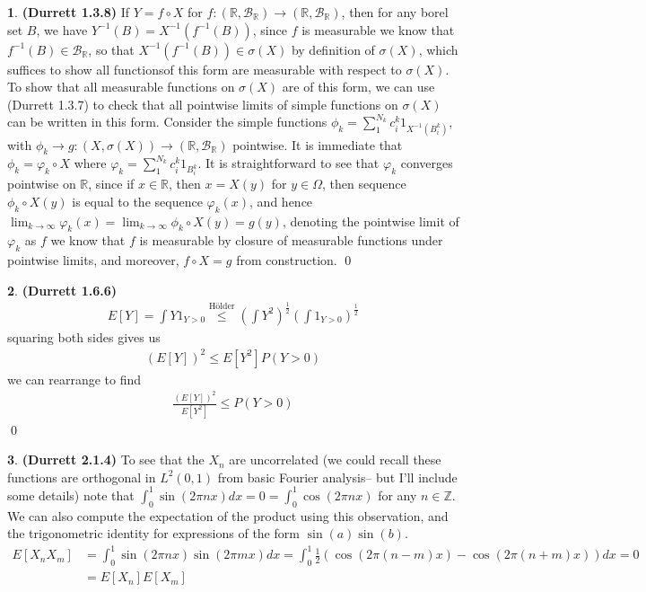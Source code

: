\documentclass[10.5pt]{article}
\theoremstyle{definition}
\newtheorem{pb}{}
\begin{document}
    \begin{pb} \textbf{(Durrett 1.3.8)}
        If \(Y = f\circ X\) for \(f: (\mathbb{R},\mathcal{B}_\mathbb{R}) \to (\mathbb{R},\mathcal{B}_\mathbb{R})\), then for any borel set \(B\), we have \(Y^{-1}(B) = X^{-1}(f^{-1}(B))\), since \(f\) is measurable we know that \(f^{-1}(B) \in \mathcal{B}_\mathbb{R}\), so that \(X^{-1}(f^{-1}(B)) \in \sigma(X)\) by definition of \(\sigma(X)\), which suffices to show all functionsof this form are measurable with respect to \(\sigma(X)\). To show that all measurable functions on \(\sigma(X)\) are of this form, we can use (Durrett 1.3.7) to check that all pointwise limits of simple functions on \(\sigma(X)\) can be written in this form. Consider the simple functions \(\phi_k = \sum_1^{N_k} c^k_i 1_{X^{-1}(B^k_i)}\), with \(\phi_k \to g: (X,\sigma(X)) \to (\mathbb{R},\mathcal{B}_\mathbb{R})\) pointwise. It is immediate that \(\phi_k = \varphi_k\circ X\) where \(\varphi_k = \sum_1^{N_k}c^k_i 1_{B_i^k}\). It is straightforward to see that \(\varphi_k\) converges pointwise on \(\mathbb{R}\), since if \(x \in \mathbb{R}\), then \(x = X(y)\) for \(y \in \Omega\), then sequence \(\phi_k\circ X (y)\) is equal to the sequence \(\varphi_k (x)\), and hence \(\lim_{k\to\infty}\varphi_k(x) = \lim_{k\to\infty}\phi_k\circ X (y) = g(y)\), denoting the pointwise limit of \(\varphi_k\) as \(f\) we know that \(f\) is measurable by closure of measurable functions under pointwise limits, and moreover, \(f \circ X = g\) from construction. \qed
    \end{pb}
    \begin{pb}\textbf{(Durrett 1.6.6)}
        \begin{align*}
            E[Y] = \int Y 1_{Y>0} \overset{\text{H\"older}}{\leq} \left(\int Y^2\right)^{\frac12}\left(\int 1_{Y>0}\right)^{\frac12}
        \end{align*}
        squaring both sides gives us
        \begin{align*}
            (E[Y])^2 \leq E[Y^2]P(Y>0)
        \end{align*}
        we can rearrange to find
        \begin{align*}
            \frac{(E[Y])^2}{E[Y^2]} \leq P(Y>0)
        \end{align*} \qed
    \end{pb}
    \begin{pb}\textbf{(Durrett 2.1.4)}
        To see that the \(X_n\) are uncorrelated (we could recall these functions are orthogonal in \(L^2(0,1)\) from basic Fourier analysis-- but I'll include some details) note that \(\int_0^1 \sin(2\pi nx)dx = 0 = \int_0^1 \cos(2\pi nx)\) for any \(n \in \mathbb{Z}\). We can also compute the expectation of the product using this observation, and the trigonometric identity for expressions of the form \(\sin(a)\sin(b)\).
        \begin{align*}
            E[X_nX_m] &= \int_0^1 \sin(2\pi nx)\sin(2\pi mx)dx = \int_0^1\frac12\left(\cos(2\pi(n - m)x) - \cos(2\pi(n+m)x)\right)dx = 0 \\ &= E[X_n]E[X_m]
        \end{align*}
    \end{pb}
\end{document}
